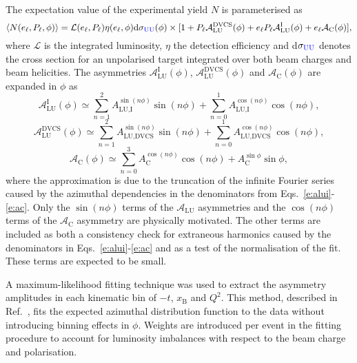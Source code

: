 The expectation value of the experimental yield $N$ is parameterised as
\begin{equation}
 \langle N(e_{\ell},P_{\ell},\phi)\rangle =
\mathcal{L}(e_{\ell},P_{\ell})\eta(e_{\ell},\phi)\textrm{d}\sigma_{{\color{blue}{\textrm{UU}}\color{black}}}
(\phi)\times
[1+P_{\ell}\mathcal{A}_{\textrm{LU}}^{\textrm{DVCS}}(\phi)+e_{\ell}P_{\ell}
\mathcal{A}_{\textrm{LU}}^{\textrm{I}}(\phi)+e_{\ell}\mathcal{A}_{\textrm{C}}
(\phi)],
\end{equation}
where $\mathcal{L}$ is the integrated luminosity, $\eta$  the detection
efficiency and d$\sigma_{{\color{blue}{\textrm{UU}}\color{black}}}$ denotes the
cross section for an unpolarised target integrated over both beam charges and
beam helicities. The asymmetries $\mathcal{A}_{\textrm{LU}}^{\textrm{I}}(\phi)$,
$\mathcal{A}_{\textrm{LU}}^{\textrm{DVCS}}(\phi)$ and
$\mathcal{A}_{\textrm{C}}(\phi)$ are expanded in
$\phi$ as
\begin{equation}
\mathcal{A}_{\textrm{LU}}^{\textrm{I}}(\phi) \simeq \sum^{2}_{n=1}
A_{\textrm{LU,I}}^{\sin(n\phi)}\sin(n\phi) 
+ \sum^{1}_{n=0} A_{\textrm{LU,I}}^{\cos(n\phi)}\cos(n\phi), 
\label{alui_asym}
\end{equation}
\begin{equation}
 \mathcal{A}_{\textrm{LU}}^{\textrm{DVCS}}(\phi) \simeq \sum^{2}_{n=1}
A_{\textrm{LU,DVCS}}^{\sin(n\phi)}\sin(n\phi) 
+ \sum^{1}_{n=0} A_{\textrm{LU,DVCS}}^{\cos(n\phi)}\cos(n\phi), 
\label{aludvcs_asym}
\end{equation}
\begin{equation}
\mathcal{A}_{\textrm{C}}(\phi) \simeq \sum^{3}_{n=0}
A_{\textrm{C}}^{\cos(n\phi)}\cos(n\phi) 
+ A_{\textrm{C}}^{\sin\phi}\sin\phi,
\label{ac_asym}
\end{equation}
where the approximation is due to the truncation of the infinite Fourier series
caused by the azimuthal dependencies in the denominators from
Eqs.~\ref{e:alui}-\ref{e:ac}. Only the $\sin(n\phi)$ terms of the
$\mathcal{A}_{\textrm{LU}}$ asymmetries and the $\cos(n\phi)$ terms of the
$\mathcal{A}_{\textrm{C}}$ asymmetry are physically motivated. The other terms
are included as both a consistency check for extraneous harmonics caused
by the denominators in Eqs.~\ref{e:alui}-\ref{e:ac} and as a test of the
normalisation of the fit. These terms are expected to be small.

A maximum-likelihood fitting technique \cite{Bar90} was used to
extract the asymmetry amplitudes in each kinematic bin of $-t$, $x_{\textrm{B}}$ and $Q^{2}$.
This method, described in Ref.~\cite{Air08}, fits the expected
azimuthal distribution function to the data without introducing binning effects in $\phi$.
Weights are introduced per event in the fitting procedure to account for
luminosity imbalances with respect to the beam charge and polarisation.

